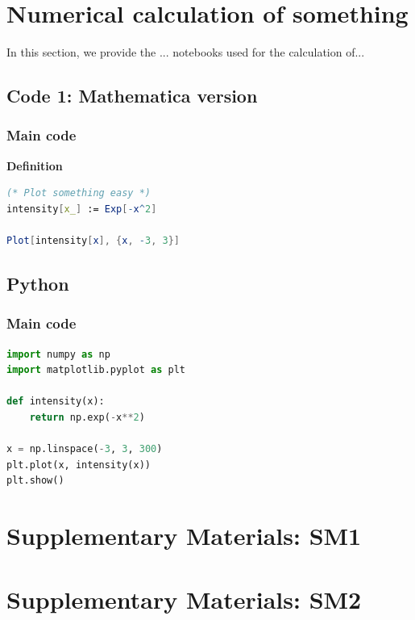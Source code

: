 \chapter[Numerical calculations]{Numerical calculation of something}
\label{AppendixA}
In this section, we provide the ... notebooks used for the calculation of... 

\section{Code 1: Mathematica version}
\subsection{Main code}



\noindent\textcolor{titlecolor2}{\textbf{\textsf{Definition }}}
\begin{lstlisting}[extendedchars=true,language=Mathematica]
(* Plot something easy *) 
intensity[x_] := Exp[-x^2]

Plot[intensity[x], {x, -3, 3}]

\end{lstlisting}


\section{Python}
\subsection{Main code }
\begin{lstlisting}[language=Python]
import numpy as np
import matplotlib.pyplot as plt

def intensity(x):
    return np.exp(-x**2)

x = np.linspace(-3, 3, 300)
plt.plot(x, intensity(x))
plt.show()
\end{lstlisting}
\chapter{Supplementary Materials: SM1}
\label{AppendixB}
 


\chapter{Supplementary Materials: SM2}
\label{AppendixC}
 

